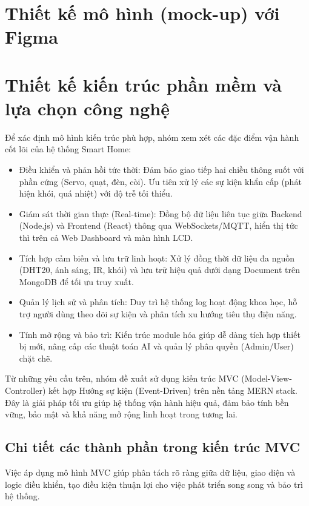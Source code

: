 \documentclass[a4paper,twoside]{article}
\begin{document}
\section{Thiết kế mô hình (mock-up) với Figma}

\section{Thiết kế kiến trúc phần mềm và lựa chọn công nghệ}
Để xác định mô hình kiến trúc phù hợp, nhóm xem xét các đặc điểm vận hành cốt lõi của hệ thống Smart Home:
\begin{itemize}[leftmargin=*]
\item Điều khiển và phản hồi tức thời: Đảm bảo giao tiếp hai chiều thông suốt với phần cứng (Servo, quạt, đèn, còi). Ưu tiên xử lý các sự kiện khẩn cấp (phát hiện khói, quá nhiệt) với độ trễ tối thiểu.

\item Giám sát thời gian thực (Real-time): Đồng bộ dữ liệu liên tục giữa Backend (Node.js) và Frontend (React) thông qua WebSockets/MQTT, hiển thị tức thì trên cả Web Dashboard và màn hình LCD.

\item Tích hợp cảm biến và lưu trữ linh hoạt: Xử lý đồng thời dữ liệu đa nguồn (DHT20, ánh sáng, IR, khói) và lưu trữ hiệu quả dưới dạng Document trên MongoDB để tối ưu truy xuất.

\item Quản lý lịch sử và phân tích: Duy trì hệ thống log hoạt động khoa học, hỗ trợ người dùng theo dõi sự kiện và phân tích xu hướng tiêu thụ điện năng.

\item Tính mở rộng và bảo trì: Kiến trúc module hóa giúp dễ dàng tích hợp thiết bị mới, nâng cấp các thuật toán AI và quản lý phân quyền (Admin/User) chặt chẽ.
\end{itemize}
Từ những yêu cầu trên, nhóm đề xuất sử dụng kiến trúc MVC (Model-View-Controller) kết hợp Hướng sự kiện (Event-Driven) trên nền tảng MERN stack. Đây là giải pháp tối ưu giúp hệ thống vận hành hiệu quả, đảm bảo tính bền vững, bảo mật và khả năng mở rộng linh hoạt trong tương lai.


\subsection{Chi tiết các thành phần trong kiến trúc MVC}
Việc áp dụng mô hình MVC giúp phân tách rõ ràng giữa dữ liệu, giao diện và logic điều khiển, tạo điều kiện thuận lợi cho việc phát triển song song và bảo trì hệ thống.
\end{document}
